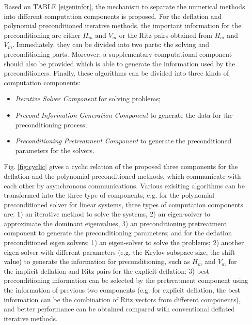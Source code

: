 Based on TABLE \ref{eigeninfor}, the mechanism to separate the numerical methods into different computation components is proposed. For the deflation and polynomial preconditioned iterative methods, the important information for the preconditioning are either $H_m$ and $V_m$ or the Ritz pairs obtained from $H_m$ and $V_m$.  Immediately, they can be divided into two parts: the solving and preconditioning parts. Moreover, a supplementary computational component should also be provided which is able to generate the information used by the preconditioners. Finally, these algorithms can be divided into three kinds of computation components:

\begin{itemize}
	\item \textit{Iterative Solver Component} for solving problems;
	\item \textit{Precond-Information Generation Component} to generate the data for the preconditioning process;
	\item \textit{Preconditioning Pretreatment Component} to generate the preconditioned parameters for the solvers.
\end{itemize}

Fig. \ref{fig:cyclic} gives a cyclic relation of the proposed three components for the deflation and the polynomial preconditioned methods, which communicate with each other by asynchronous communications. Various exisiting algorithms can be transformed into the three type of components, e.g. for the polynomial preconditioned solver for linear systems, three types of computation components are: 1) an iterative method to solve the systems, 2) an eigen-solver to approximate the dominant eigenvalues, 3) an preconditioning pretreatment component to generate the preconditioning parameters; and for the deflation preconditioned eigen solvers: 1) an eigen-solver to solve the problems; 2) another eigen-solver with different parameters (e.g. the Krylov subspace size, the shift value) to generate the information for preconditioning, such as $H_m$ and $V_m$ for the implicit deflation and Ritz pairs for the explicit deflation; 3) best preconditioning information can be selected by the pretreatment component using the information of previous two components (e.g. for explicit deflation, the best information can be the combination of Ritz vectors from different components), and better performance can be obtained compared with conventional deflated iterative methods.

